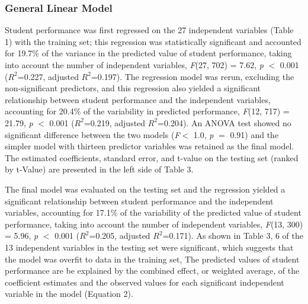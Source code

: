 \documentclass[sigconf]{acmart}
\begin{document}
\subsubsection{General Linear Model}

Student performance was first regressed on the 27 independent variables 
(Table 1) with the training set; this regression was statistically 
significant and accounted for 19.7\% of the variance in the predicted
value of student performance, taking into account the number of 
independent variables, \textit{F}(27, 702) = 7.62, \textit{p} $<$ 0.001 
($R^2$=0.227, adjusted $R^2$=0.197). The regression model was rerun, 
excluding the non-significant predictors, and this regression also 
yielded a significant relationship between student performance and the 
independent variables, accounting for 20.4\% of the variability in 
predicted performance, \textit{F}(12, 717) = 21.79, \textit{p} $<$ 0.001 
($R^2$=0.219, adjusted $R^2$=0.204). An ANOVA test showed no significant 
difference between the two models (\textit{F}$<$ 1.0, \textit{p} $=$ 0.91) 
and the simpler model with thirteen predictor variables was retained as the 
final model. The estimated coefficients, standard error, and t-value on the 
testing set (ranked by t-Value) are presented in the left side of Table 3.



The final model was evaluated on the testing set and the regression yielded 
a significant relationship between student performance and the independent 
variables, accounting for 17.1\% of the variability of the predicted value 
of student performance, taking into account the number of independent 
variables, \textit{F}(13, 300) = 5.96, \textit{p} $<$ 0.001 ($R^2$=0.205, 
adjusted $R^2$=0.171). As shown in Table 3, 6 of the 13 independent
variables in the testing set were significant, which suggests that the 
model was overfit to data in the training set, The predicted values of
student performance are be explained by the combined effect, or 
weighted average, of the coefficient estimates and the observed values 
for each significant independent variable in the model (Equation 2).
\end{document}
